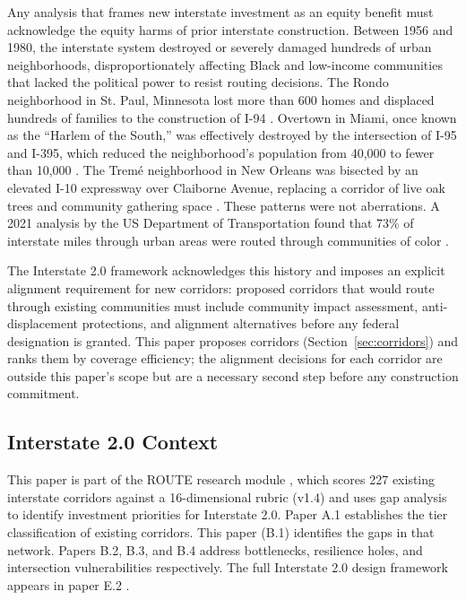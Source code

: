 Any analysis that frames new interstate investment as an equity benefit must acknowledge the equity harms of prior interstate construction. Between 1956 and 1980, the interstate system destroyed or severely damaged hundreds of urban neighborhoods, disproportionately affecting Black and low-income communities that lacked the political power to resist routing decisions. The Rondo neighborhood in St. Paul, Minnesota lost more than 600 homes and displaced hundreds of families to the construction of I-94 \citep{Ehrenfeucht2015}. Overtown in Miami, once known as the ``Harlem of the South,'' was effectively destroyed by the intersection of I-95 and I-395, which reduced the neighborhood's population from 40,000 to fewer than 10,000 \citep{Connolly2014}. The Tremé neighborhood in New Orleans was bisected by an elevated I-10 expressway over Claiborne Avenue, replacing a corridor of live oak trees and community gathering space \citep{Lewis1976}. These patterns were not aberrations. A 2021 analysis by the US Department of Transportation found that 73\% of interstate miles through urban areas were routed through communities of color \citep{USDOT_Equity2021}.

The Interstate 2.0 framework acknowledges this history and imposes an explicit alignment requirement for new corridors: proposed corridors that would route through existing communities must include community impact assessment, anti-displacement protections, and alignment alternatives before any federal designation is granted. This paper proposes corridors (Section~\ref{sec:corridors}) and ranks them by coverage efficiency; the alignment decisions for each corridor are outside this paper's scope but are a necessary second step before any construction commitment.

\subsection{Interstate 2.0 Context}

This paper is part of the ROUTE research module \citep{ROUTE_MODULE2026}, which scores 227 existing interstate corridors against a 16-dimensional rubric (v1.4) and uses gap analysis to identify investment priorities for Interstate 2.0. Paper A.1 \citep{ROUTE_A1} establishes the tier classification of existing corridors. This paper (B.1) identifies the gaps in that network. Papers B.2, B.3, and B.4 address bottlenecks, resilience holes, and intersection vulnerabilities respectively. The full Interstate 2.0 design framework appears in paper E.2 \citep{ROUTE_E2}.
